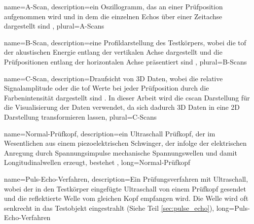 
 { name={A-Scan}, description={ein Oszillogramm, das an einer Prüfposition aufgenommen wird und in dem die einzelnen Echos über einer Zeitachse dargestellt sind \cite{WSPraktikumUS1}}, plural={A-Scans}}

 { name={B-Scan}, description={eine Profildarstellung des Testkörpers, wobei die \acrshort{tof} der akustischen Energie entlang der vertikalen Achse dargestellt und die Prüfpositionen entlang der horizontalen Achse präsentiert sind \cite{UTDataPresentation}}, plural={B-Scans}}

 { name={C-Scan}, description={Draufsicht von 3D Daten, wobei die relative Signalamplitude oder die \acrshort{tof} Werte bei jeder Prüfposition durch die Farbenintensität dargestellt sind \cite{UTDataPresentation}. In dieser Arbeit wird die \gls{cscan} Darstellung für die Visualisierung der Daten verwendet, da sich dadurch 3D Daten in eine 2D Darstellung transformieren lassen}, plural={C-Scans}}

 {name={Normal-Prüfkopf}, description={ein Ultraschall Prüfkopf, der im Wesentlichen aus einem piezoelektrischen Schwinger, der infolge der elektrischen Anregung durch Spannungsimpulse mechanische Spannungswellen und damit Longitudinalwellen erzeugt, bestehet \cite{UTNormalPruefkopf}}, long={Normal-Prüfkopf}}

 {name={Puls-Echo-Verfahren}, description={Ein Prüfungsverfahren mit Ultraschall, wobei der in den Testkörper eingefügte Ultraschall von einem Prüfkopf gesendet und die reflektierte Welle vom gleichen Kopf empfangen wird. Die Welle wird oft senkrecht in das Testobjekt eingestrahlt (Siehe Teil \ref{sec:pulse_echo})}, long={Puls-Echo-Verfahren} }









